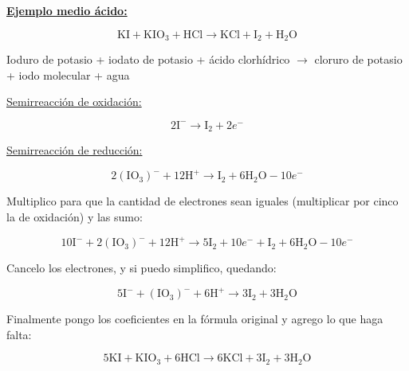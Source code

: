 \skipline
\textbf{\underline{Ejemplo medio ácido:}}

$$\text{KI} + \text{K} \text{I} \text{O}_3 + \text{H} \text{Cl} \longrightarrow
\text{KCl} + \text{I}_2 +  \text{H}_2 \text{O}$$

\hfil Ioduro de potasio \hfil + \hfil iodato de potasio \hfil + \hfil ácido clorhídrico \hfil
$\rightarrow$ \hfil
cloruro de potasio \hfil + \hfil iodo molecular \hfil + \hfil agua \hfil 

\begin{multicols}{2}

\underline{Semirreacción de oxidación:}

$$2\text{I}^{-} \longrightarrow \text{I}_2 + 2e^-$$

\underline{Semirreacción de reducción:}

$$2(\text{IO}_3)^{-} + 12 \text{H}^+ \longrightarrow \text{I}_2 + 6\text{H}_2 \text{O} - 10e^-$$
\end{multicols}

Multiplico para que la cantidad de electrones sean iguales (multiplicar por cinco la de oxidación) y las sumo:

$$10\text{I}^{-} + 2(\text{IO}_3)^{-} + 12 \text{H}^+ \longrightarrow 5 \text{I}_2 + 10 e^- + \text{I}_2 + 6\text{H}_2 \text{O} - 10e^-$$

Cancelo los electrones, y si puedo simplifico, quedando:

$$5\text{I}^{-} + (\text{IO}_3)^{-} + 6 \text{H}^+ \longrightarrow 3 \text{I}_2 + 3\text{H}_2 \text{O}$$

Finalmente pongo los coeficientes en la fórmula original y agrego lo que haga falta:

$$5\text{KI} + \text{K} \text{I} \text{O}_3 + 6\text{H} \text{Cl} \longrightarrow
6\text{KCl} + 3\text{I}_2 +  3\text{H}_2 \text{O}$$

